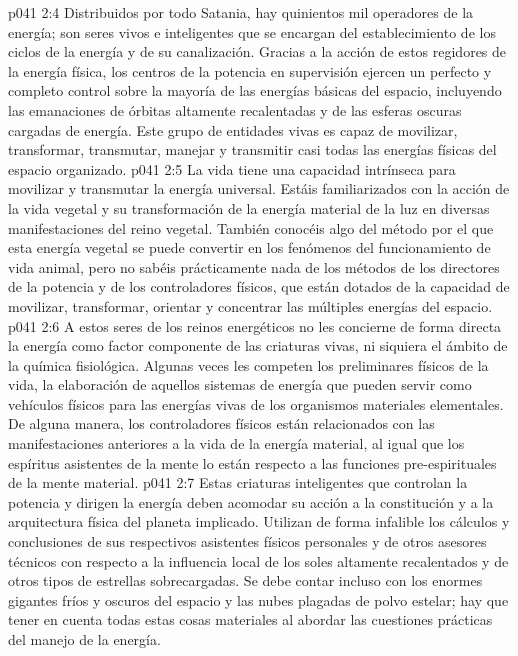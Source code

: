 \vs p041 2:4 Distribuidos por todo Satania, hay quinientos mil operadores de la energía; son seres vivos e inteligentes que se encargan del establecimiento de los ciclos de la energía y de su canalización. Gracias a la acción de estos regidores de la energía física, los centros de la potencia en supervisión ejercen un perfecto y completo control sobre la mayoría de las energías básicas del espacio, incluyendo las emanaciones de órbitas altamente recalentadas y de las esferas oscuras cargadas de energía. Este grupo de entidades vivas es capaz de movilizar, transformar, transmutar, manejar y transmitir casi todas las energías físicas del espacio organizado.
\vs p041 2:5 La vida tiene una capacidad intrínseca para movilizar y transmutar la energía universal. Estáis familiarizados con la acción de la vida vegetal y su transformación de la energía material de la luz en diversas manifestaciones del reino vegetal. También conocéis algo del método por el que esta energía vegetal se puede convertir en los fenómenos del funcionamiento de vida animal, pero no sabéis prácticamente nada de los métodos de los directores de la potencia y de los controladores físicos, que están dotados de la capacidad de movilizar, transformar, orientar y concentrar las múltiples energías del espacio.
\vs p041 2:6 \pc A estos seres de los reinos energéticos no les concierne de forma directa la energía como factor componente de las criaturas vivas, ni siquiera el ámbito de la química fisiológica. Algunas veces les competen los preliminares físicos de la vida, la elaboración de aquellos sistemas de energía que pueden servir como vehículos físicos para las energías vivas de los organismos materiales elementales. De alguna manera, los controladores físicos están relacionados con las manifestaciones anteriores a la vida de la energía material, al igual que los espíritus asistentes de la mente lo están respecto a las funciones pre\hyp{}espirituales de la mente material.
\vs p041 2:7 \pc Estas criaturas inteligentes que controlan la potencia y dirigen la energía deben acomodar su acción a la constitución y a la arquitectura física del planeta implicado. Utilizan de forma infalible los cálculos y conclusiones de sus respectivos asistentes físicos personales y de otros asesores técnicos con respecto a la influencia local de los soles altamente recalentados y de otros tipos de estrellas sobrecargadas. Se debe contar incluso con los enormes gigantes fríos y oscuros del espacio y las nubes plagadas de polvo estelar; hay que tener en cuenta todas estas cosas materiales al abordar las cuestiones prácticas del manejo de la energía.
